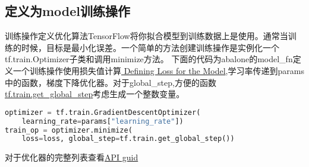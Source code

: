 \subsection{定义为model训练操作}
训练操作定义优化算法TensorFlow将你拟合模型到训练数据上是使用。通常当训练的时候，目标是最小化误差。一个简单的方法创建训练操作是实例化一个tf.train.Optimizer子类和调用minimize方法。
下面的代码为abalone的model\_fn定义一个训练操作使用损失值计算\href{https://www.tensorflow.org/extend/estimators#defining_loss}{ Defining Loss for the Model},学习率传递到params中的函数，梯度下降优化器。对于global\_step,方便的函数\href{https://www.tensorflow.org/api_docs/python/tf/train/get_global_step}{tf.train.get\_global\_step}考虑生成一个整数变量。
\begin{lstlisting}[language=Python]
optimizer = tf.train.GradientDescentOptimizer(
    learning_rate=params["learning_rate"])
train_op = optimizer.minimize(
    loss=loss, global_step=tf.train.get_global_step())
\end{lstlisting}
对于优化器的完整列表查看\href{https://www.tensorflow.org/api_guides/python/train#optimizers}{API guid}
